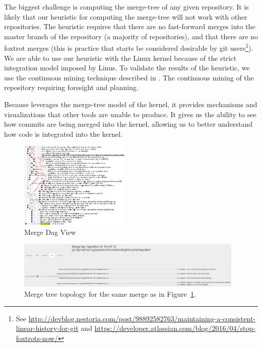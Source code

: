 \documentclass[conference, draftclsnofoot, draft]{IEEEtran}
\begin{document}
The biggest challenge is computing the merge-tree of any given repository. It
is likely that our heuristic for computing the merge-tree will not work with other
repositories. The heuristic requires that there are no fast-forward merges into the
master branch of the repository (a majority of repositories), and that there are no
foxtrot merges (this is practice that starts be considered desirable by git users\footnote{See
  \url{http://devblog.nestoria.com/post/98892582763/maintaining-a-consistent-linear-history-for-git} and
  \url{https://developer.atlassian.com/blog/2016/04/stop-foxtrots-now/}}).
We are able to use our heuristic with the Linux kernel because of
the strict integration model imposed by Linus. To validate the results of the
heuristic, we use the continuous mining technique described in \cite{German2015}.
The continuous mining of the repository requiring foresight and planning.

Because \tool leverages the merge-tree model of the kernel, it provides mechanisms
and visualizations that other tools are unable to produce. It gives us the ability to
see how commits are being merged into the kernel, allowing us to better understand
how code is integrated into the kernel.

\begin{figure}
        \centering
        \includegraphics[width=0.47\textwidth]{figures/042dd_DAG.png}
        \caption{Merge Dag View}
        \label{fig:dag_view}
\end{figure}

\begin{figure}
        \centering
        \includegraphics[width=0.97\textwidth]{figures/042dd_tree.png}
        \caption{Merge tree topology for the same merge as in
                Figure~\ref{fig:dag_view}.}
        \label{fig:tree_view}
\end{figure}
\end{document}

